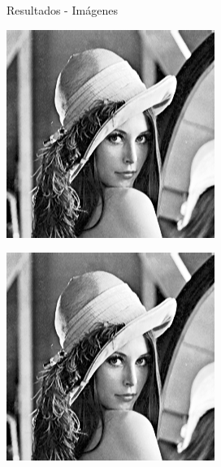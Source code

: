 \documentclass{beamer}
\begin{document}
\begin{frame}[fragile]{Resultados - Imágenes}
\begin{minipage}{0.32\linewidth}
		\includegraphics[width=\linewidth]{../results/lena_ej5}
		\label{fig:lenaej6a}
	\end{minipage}\hfill
	\begin{minipage}{0.32\linewidth}
		\centering
		\includegraphics[width=\linewidth]{../results/lena_ej6}
		\label{fig:lenaej6b}
	\end{minipage}
\end{frame}
\end{document}
